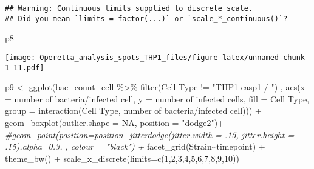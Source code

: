 \documentclass[
]{article}
\newenvironment{Shaded}{\begin{snugshade}}{\end{snugshade}}
\newcommand{\AttributeTok}[1]{\textcolor[rgb]{0.77,0.63,0.00}{#1}}
\newcommand{\CommentTok}[1]{\textcolor[rgb]{0.56,0.35,0.01}{\textit{#1}}}
\newcommand{\ConstantTok}[1]{\textcolor[rgb]{0.00,0.00,0.00}{#1}}
\newcommand{\DecValTok}[1]{\textcolor[rgb]{0.00,0.00,0.81}{#1}}
\newcommand{\FunctionTok}[1]{\textcolor[rgb]{0.00,0.00,0.00}{#1}}
\newcommand{\NormalTok}[1]{#1}
\newcommand{\OtherTok}[1]{\textcolor[rgb]{0.56,0.35,0.01}{#1}}
\newcommand{\SpecialCharTok}[1]{\textcolor[rgb]{0.00,0.00,0.00}{#1}}
\newcommand{\StringTok}[1]{\textcolor[rgb]{0.31,0.60,0.02}{#1}}
\begin{document}
\begin{verbatim}
## Warning: Continuous limits supplied to discrete scale.
## Did you mean `limits = factor(...)` or `scale_*_continuous()`?
\end{verbatim}

\begin{Shaded}
\begin{Highlighting}[]
\NormalTok{p8}
\end{Highlighting}
\end{Shaded}

\texttt{[image: Operetta\_analysis\_spots\_THP1\_files/figure-latex/unnamed-chunk-1-11.pdf]}

\begin{Shaded}
\begin{Highlighting}[]
\NormalTok{p9 }\OtherTok{\textless{}{-}} \FunctionTok{ggplot}\NormalTok{(bac\_count\_cell }\SpecialCharTok{\%\textgreater{}\%}
               \FunctionTok{filter}\NormalTok{(}\StringTok{\textasciigrave{}}\AttributeTok{Cell Type}\StringTok{\textasciigrave{}} \SpecialCharTok{!=} \StringTok{"THP1 casp1{-}/{-}"}\NormalTok{)}
\NormalTok{             , }\FunctionTok{aes}\NormalTok{(}\AttributeTok{x =} \StringTok{\textasciigrave{}}\AttributeTok{number of bacteria/infected cell}\StringTok{\textasciigrave{}}\NormalTok{, }\AttributeTok{y =} \StringTok{\textasciigrave{}}\AttributeTok{number of infected cells}\StringTok{\textasciigrave{}}\NormalTok{, }\AttributeTok{fill =} \StringTok{\textasciigrave{}}\AttributeTok{Cell Type}\StringTok{\textasciigrave{}}\NormalTok{,}
                   \AttributeTok{group =}  \FunctionTok{interaction}\NormalTok{(}\StringTok{\textasciigrave{}}\AttributeTok{Cell Type}\StringTok{\textasciigrave{}}\NormalTok{, }\StringTok{\textasciigrave{}}\AttributeTok{number of bacteria/infected cell}\StringTok{\textasciigrave{}}\NormalTok{))) }\SpecialCharTok{+}
  \FunctionTok{geom\_boxplot}\NormalTok{(}\AttributeTok{outlier.shape =} \ConstantTok{NA}\NormalTok{, }\AttributeTok{position =} \StringTok{"dodge2"}\NormalTok{)}\SpecialCharTok{+}
  \CommentTok{\#geom\_point(position=position\_jitterdodge(jitter.width = .15, jitter.height = .15),alpha=0.3, , colour = "black") +}
  \FunctionTok{facet\_grid}\NormalTok{(Strain}\SpecialCharTok{\textasciitilde{}}\NormalTok{timepoint) }\SpecialCharTok{+}
  \FunctionTok{theme\_bw}\NormalTok{() }\SpecialCharTok{+}
  \FunctionTok{scale\_x\_discrete}\NormalTok{(}\AttributeTok{limits=}\FunctionTok{c}\NormalTok{(}\DecValTok{1}\NormalTok{,}\DecValTok{2}\NormalTok{,}\DecValTok{3}\NormalTok{,}\DecValTok{4}\NormalTok{,}\DecValTok{5}\NormalTok{,}\DecValTok{6}\NormalTok{,}\DecValTok{7}\NormalTok{,}\DecValTok{8}\NormalTok{,}\DecValTok{9}\NormalTok{,}\DecValTok{10}\NormalTok{))}
\end{Highlighting}
\end{Shaded}
\end{document}

